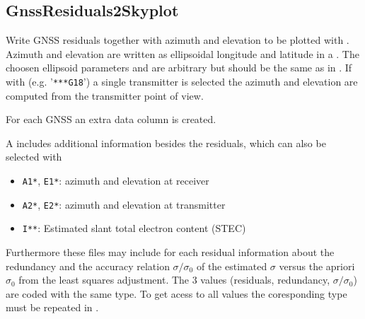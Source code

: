 \clearpage
\subsection{GnssResiduals2Skyplot}\label{GnssResiduals2Skyplot}
Write GNSS residuals together with azimuth and elevation to be plotted with .
Azimuth and elevation are written as ellipsoidal longitude and latitude in a .
The choosen ellipsoid parameters  and  are arbitrary but should be the same
as in . If with  (e.g. '\verb|***G18|')
a single transmitter is selected the azimuth and elevation are computed from the transmitter point of view.

For each GNSS  an extra data column is created.

A  includes additional information
besides the residuals, which can also be selected with 
\begin{itemize}
\item \verb|A1*|, \verb|E1*|: azimuth and elevation at receiver
\item \verb|A2*|, \verb|E2*|: azimuth and elevation at transmitter
\item \verb|I**|: Estimated slant total electron content (STEC)
\end{itemize}

Furthermore these files may include for each residual 
information about the redundancy and the accuracy relation $\sigma/\sigma_0$
of the estimated $\sigma$ versus the apriori $\sigma_0$ from the least squares adjustment.
The 3 values (residuals, redundancy, $\sigma/\sigma_0$) are coded with the same type.
To get acess to all values the coresponding type must be repeated in .



